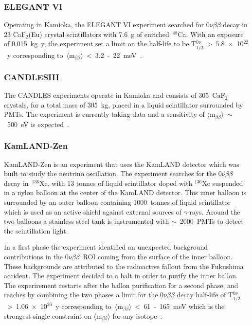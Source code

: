 \documentclass[main.tex]{subfiles}
\begin{document}
\subsubsection{ELEGANT VI}


\NI Operating in Kamioka, the ELEGANT VI experiment searched for 0$\nu\beta\beta$ decay in 23 CaF$_\text{2}$(Eu) crystal scintillators with 7.6~g of enriched~$^{\text{48}}$Ca. With an exposure of 0.015~kg~y, the experiment set a limit on the half-life to be T$_{\text{1/2}}^{0\nu}$~>~5.8~$\times$~10$^{\text{22}}$~y corresponding to~$\langle \text{m}_{\beta\beta} \rangle$~<~3.2~-~22~meV~\cite{ELEGANTVI}.


\subsubsection{CANDLESIII}


\NI The CANDLES experiments operate in Kamioka and consists of 305~CaF$_\text{2}$ crystals, for a total mass of 305~kg, placed in a liquid scintillator surrounded by PMTs. The experiment is currently taking data and a sensitivity of $\langle \text{m}_{\beta\beta} \rangle$~$\sim$~500~eV is expected~\cite{CANDLESIII}.


\subsubsection{KamLAND-Zen}


\NI KamLAND-Zen is an experiment that uses the KamLAND detector which was built to study the neutrino oscillation. The experiment searches for the 0$\nu\beta\beta$ decay in~$^{\text{136}}$Xe, with 13 tonnes of liquid scintillator doped with $^{\text{136}}$Xe suspended in a nylon balloon at the center of the KamLAND detector. This inner balloon is surrounded by an outer balloon containing 1000~tonnes of liquid scintillator which is used as an active shield against external sources of $\gamma$-rays. Around the two balloons a stainless steel tank is instrumented with $\sim$~2000~PMTs to detect the scintillation light.


\bigskip


\NI In a first phase the experiment identified an unexpected background contributions in the 0$\nu\beta\beta$~ROI coming from the surface of the inner balloon. These backgrounds are attributed to the radioactive fallout from the Fukushima accident. The experiment decided to a halt in order to purify the inner ballon. The experirement restarts after the ballon purification for a second phase, and reaches by combining the two phases a limit for the 0$\nu\beta\beta$ decay half-life of T$_{\text{1/2}}^{0\nu}$~>~1.06~$\times$~10$^{\text{26}}$~y corresponding to~$\langle \text{m}_{\beta\beta} \rangle$~<~61~-~165~meV which is the strongest single constraint on $\langle \text{m}_{\beta\beta} \rangle$ for any isotope~\cite{KamLAND-ZenRecent}.    
\end{document}
